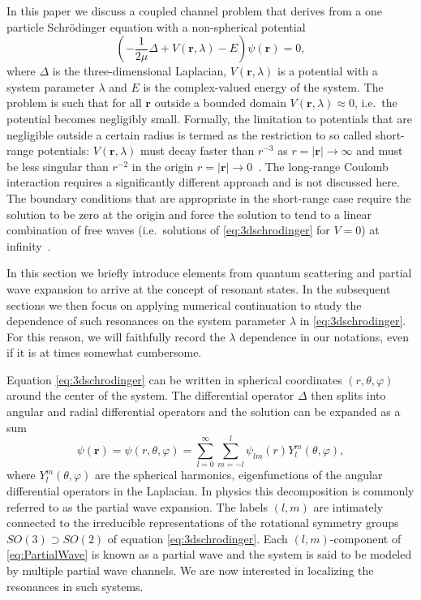 \documentclass[mathpazo]{cicp}
\begin{document}
In this paper we discuss a coupled channel problem that derives from a one particle Schr\"odinger equation with a non-spherical potential
\begin{equation}
	\label{eq:3dschrodinger}
  	\left(-\frac{1}{2\mu}{\Delta} + V(\mathbold{r},\lambda) - E  \right) \psi(\mathbold{r}) =0,  
\end{equation}
where $\Delta$ is the three-dimensional Laplacian, $V(\mathbold{r},\lambda)$ is a potential with a system parameter $\lambda$ and $E$ is the complex-valued energy of the system.
The problem is such that for all $\mathbold{r}$ outside a bounded domain $V(\mathbold{r},\lambda) \approx 0$, i.e.\ the potential becomes negligibly small. Formally, the limitation to potentials that are negligible outside a certain radius is termed as the restriction to so called short-range potentials: $V(\mathbold{r},\lambda)$ must decay faster than $r^{-3}$ as $r=|\mathbold{r}|\to\infty$ and must be less singular than $r^{-2}$ in the origin $r=|\mathbold{r}|\to0$~\cite{Taylor2006}. The long-range Coulomb interaction requires a significantly different approach and is not discussed here. The boundary conditions that are appropriate in the short-range case require the solution to be zero at the origin and force the solution to tend to a linear combination of free waves (i.e.\ solutions of \eqref{eq:3dschrodinger} for $V=0$) at infinity~\cite{Taylor2006}.

In this section we briefly introduce elements from quantum scattering and partial wave expansion to arrive at the concept of resonant states. In the subsequent sections we then focus on applying numerical continuation to study the dependence of such resonances on the system parameter $\lambda$ in \eqref{eq:3dschrodinger}. For this reason, we will faithfully record the $\lambda$ dependence in our notations, even if it is at times somewhat cumbersome.

Equation \eqref{eq:3dschrodinger} can be written in spherical coordinates $(r,\theta, \varphi)$ around the center of the system. The differential operator $\Delta$ then splits into angular and radial differential operators and the solution can be expanded as a sum
\begin{equation}
	\psi(\mathbold{r}) = \psi(r,\theta,\varphi) = \sum_{l=0}^{\infty}\sum_{m=-l}^{l} \psi_{lm}(r) Y_{l}^{m}(\theta, \varphi),
	\label{eq:PartialWave}
\end{equation}
where $Y_{l}^{m}(\theta,\varphi)$ are the spherical harmonics, eigenfunctions of the angular differential operators in the Laplacian.  
In physics this decomposition is commonly referred to as the partial wave expansion. The labels $(l,m)$ are intimately connected to the irreducible representations of the rotational symmetry groups $SO(3) \supset SO(2)$ of equation \eqref{eq:3dschrodinger}. Each $(l,m)$-component of \eqref{eq:PartialWave} is known as a partial wave and the system is said to be modeled by multiple partial wave channels. We are now interested in localizing the resonances in such systems.
\end{document}
